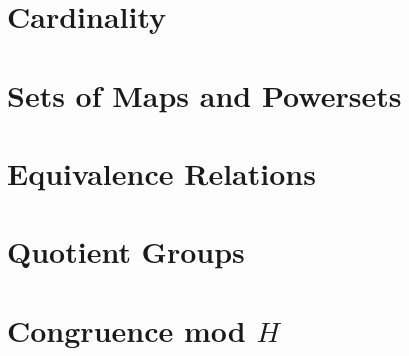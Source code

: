 \documentclass{report}
\begin{document}

\section{Cardinality}
\section{Sets of Maps and Powersets}
\section{Equivalence Relations}
\section{Quotient Groups}
\section{Congruence mod \( H \)}


\end{document}
